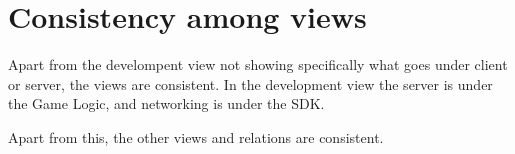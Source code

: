\section{Consistency among views} 
\label{sec:consistencyamongviews}

Apart from the develompent view not showing specifically what goes under client
or server, the views are consistent. In the development view the server is
under the Game Logic, and networking is under the SDK.

Apart from this, the other views and relations are consistent.
